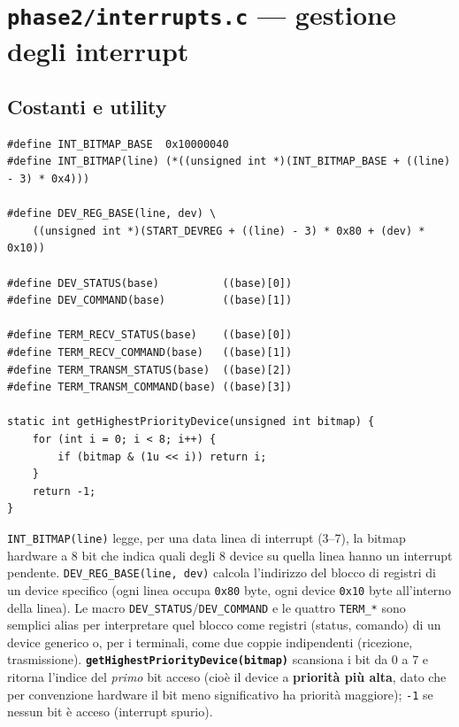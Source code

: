 \documentclass[11pt,a4paper]{article}
\newcommand{\code}[1]{\texttt{#1}}
\newcommand{\func}[1]{\textbf{\texttt{#1}}}
\begin{document}
\section{\code{phase2/interrupts.c} --- gestione degli interrupt}

\subsection{Costanti e utility}
\begin{lstlisting}
#define INT_BITMAP_BASE  0x10000040
#define INT_BITMAP(line) (*((unsigned int *)(INT_BITMAP_BASE + ((line) - 3) * 0x4)))

#define DEV_REG_BASE(line, dev) \
    ((unsigned int *)(START_DEVREG + ((line) - 3) * 0x80 + (dev) * 0x10))

#define DEV_STATUS(base)          ((base)[0])
#define DEV_COMMAND(base)         ((base)[1])

#define TERM_RECV_STATUS(base)    ((base)[0])
#define TERM_RECV_COMMAND(base)   ((base)[1])
#define TERM_TRANSM_STATUS(base)  ((base)[2])
#define TERM_TRANSM_COMMAND(base) ((base)[3])

static int getHighestPriorityDevice(unsigned int bitmap) {
    for (int i = 0; i < 8; i++) {
        if (bitmap & (1u << i)) return i;
    }
    return -1;
}
\end{lstlisting}
\code{INT\_BITMAP(line)} legge, per una data linea di interrupt (3--7), la
bitmap hardware a 8 bit che indica quali degli 8 device su quella linea
hanno un interrupt pendente. \code{DEV\_REG\_BASE(line, dev)} calcola
l'indirizzo del blocco di registri di un device specifico (ogni linea
occupa \code{0x80} byte, ogni device \code{0x10} byte all'interno della
linea). Le macro \code{DEV\_STATUS}/\code{DEV\_COMMAND} e le quattro
\code{TERM\_*} sono semplici alias per interpretare quel blocco come
registri (status, comando) di un device generico o, per i terminali, come
due coppie indipendenti (ricezione, trasmissione).
\func{getHighestPriorityDevice(bitmap)} scansiona i bit da 0 a 7 e ritorna
l'indice del \emph{primo} bit acceso (cioè il device a \textbf{priorità più
alta}, dato che per convenzione hardware il bit meno significativo ha
priorità maggiore); \code{-1} se nessun bit è acceso (interrupt spurio).
\end{document}
